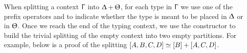 When splitting a context $\Upgamma$ into $\Updelta + \Uptheta$, for each type
in $\Upgamma$ we use one of the prefix operators \AgdaInductiveConstructor{<}
and \AgdaInductiveConstructor{>} to indicate whether the type is meant to be
placed in $\Updelta$ or in $\Uptheta$. Once we reach the end of the typing
context, we use the constructor  to build the
trivial splitting of the empty context into two empty partitions.
%
For example, below is a proof of the splitting $[A, B, C,
D] \simeq [B] + [A, C, D]$.

\begin{code}[hide]%
\>[0]\AgdaSpace{}%
\AgdaModule{\AgdaUnderscore{}}\AgdaSpace{}%
\<%
\\
\>[0][@{}l@{\AgdaIndent{0}}]%
\>[2]\AgdaSpace{}%
\AgdaSpace{}%
\AgdaSpace{}%
\AgdaSpace{}%
\AgdaSpace{}%
\AgdaSymbol{:}\AgdaSpace{}%
\<%
\end{code}
\begin{code}%
%
\>[2]\AgdaSpace{}%
\AgdaSymbol{:}\AgdaSpace{}%
\AgdaSymbol{(}\AgdaSpace{}%
\AgdaSpace{}%
\AgdaSpace{}%
\AgdaSpace{}%
\AgdaSpace{}%
\AgdaSpace{}%
\AgdaSpace{}%
\AgdaSpace{}%
\AgdaInductiveConstructor{[]}\AgdaSymbol{)}\AgdaSpace{}%
\AgdaSpace{}%
\AgdaOperator{\AgdaFunction{[}}\AgdaSpace{}%
\AgdaSpace{}%
\AgdaOperator{\AgdaFunction{]}}\AgdaSpace{}%
\AgdaOperator{\AgdaDatatype{+}}\AgdaSpace{}%
\AgdaSymbol{(}\AgdaSpace{}%
\AgdaSpace{}%
\AgdaSpace{}%
\AgdaSpace{}%
\AgdaSpace{}%
\AgdaSpace{}%
\AgdaInductiveConstructor{[]}\AgdaSymbol{)}\<%
\\
%
\>[2]\AgdaSpace{}%
\AgdaSymbol{=}\AgdaSpace{}%
\AgdaOperator{\AgdaInductiveConstructor{>}}\AgdaSpace{}%
\AgdaOperator{\AgdaInductiveConstructor{<}}\AgdaSpace{}%
\AgdaOperator{\AgdaInductiveConstructor{>}}\AgdaSpace{}%
\AgdaOperator{\AgdaInductiveConstructor{>}}\AgdaSpace{}%
\<%
\end{code}

